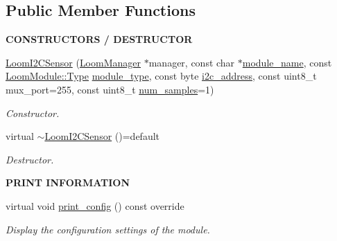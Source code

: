 \subsection*{Public Member Functions}
\begin{Indent}{\bf C\+O\+N\+S\+T\+R\+U\+C\+T\+O\+RS / D\+E\+S\+T\+R\+U\+C\+T\+OR}\par
\begin{DoxyCompactItemize}
\item 
\hyperlink{class_loom_i2_c_sensor_a974180c199ef01753afc67bc59c1e2c2}{Loom\+I2\+C\+Sensor} (\hyperlink{class_loom_manager}{Loom\+Manager} $\ast$manager, const char $\ast$\hyperlink{class_loom_module_adf6e68ad7e9fa2acfca7a8a280680764}{module\+\_\+name}, const \hyperlink{class_loom_module_aee91d0a75140d51ee428fc2d4417d865}{Loom\+Module\+::\+Type} \hyperlink{class_loom_module_a152d394f37236a2b159dae19da67eeb0}{module\+\_\+type}, const byte \hyperlink{class_loom_i2_c_sensor_a6ff389c1f015152a9ebfccb037d3d90e}{i2c\+\_\+address}, const uint8\+\_\+t mux\+\_\+port=255, const uint8\+\_\+t \hyperlink{class_loom_sensor_a0e74ebbaecde15ed1c71e1bb6bc6aebe}{num\+\_\+samples}=1)
\begin{DoxyCompactList}\small\item\em Constructor. \end{DoxyCompactList}\item 
virtual \hyperlink{class_loom_i2_c_sensor_ac27cd8c9d81b92b2c0dcb8f8808a530e}{$\sim$\+Loom\+I2\+C\+Sensor} ()=default
\begin{DoxyCompactList}\small\item\em Destructor. \end{DoxyCompactList}\end{DoxyCompactItemize}
\end{Indent}
\begin{Indent}{\bf P\+R\+I\+NT I\+N\+F\+O\+R\+M\+A\+T\+I\+ON}\par
\begin{DoxyCompactItemize}
\item 
virtual void \hyperlink{class_loom_i2_c_sensor_ab90004ce30a281b7f51ecf3093ca4cea}{print\+\_\+config} () const override
\begin{DoxyCompactList}\small\item\em Display the configuration settings of the module. \end{DoxyCompactList}\end{DoxyCompactItemize}
\end{Indent}

